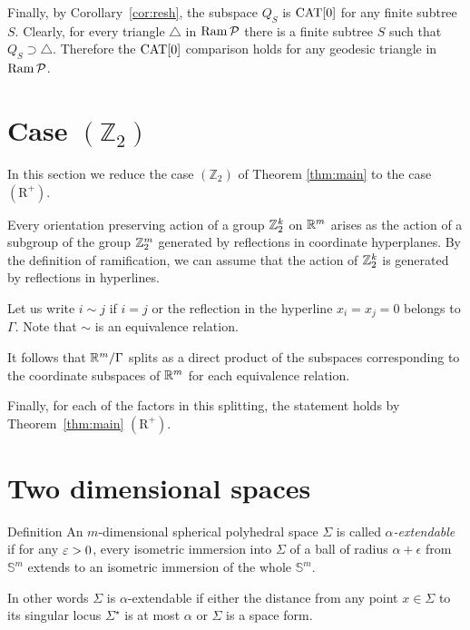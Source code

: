 \documentclass[oneside,a4paper]{article}
\def\Ram{\mathop{\rm Ram}\nolimits}
\def\SS{\mathbb{S}}
\begin{document}
Finally, by Corollary~\ref{cor:resh},
the subspace $Q_S$ is  $\mathrm{CAT}[0]$ for any finite subtree $S$.
Clearly, for every triangle $\triangle$ in $\Ram\mathcal{P}$
there is a finite subtree $S$ such that $Q_S\supset\triangle$.
Therefore the $\mathrm{CAT}[0]$ comparison holds for any geodesic triangle in $\Ram\mathcal{P}$.
\qeds

\section{Case $(\mathbb{Z}_2)$}

In this section we reduce the case $(\mathbb{Z}_2)$ of Theorem \ref{thm:main} to  the case $(\mathrm{R}^+)$.

Every orientation preserving action of a group $\mathbb{Z}_2^k$ on $\mathbb{R}^m$ arises as
the action of a subgroup of the group $\mathbb{Z}_2^m$ generated by reflections in coordinate  hyperplanes.
By the definition of ramification, 
we can assume that the action of $\mathbb{Z}_2^k$ 
is generated by reflections in hyperlines.

Let us write $i\sim j$ if $i=j$ or  the reflection in
the hyperline $x_i=x_j=0$ belongs to $\Gamma$.
Note that $\sim$ is an equivalence relation.

It follows that $\mathbb{R}^m/\Gamma$ splits as a direct product of the subspaces corresponding to the coordinate subspaces of $\mathbb{R}^m$ for each equivalence relation.

Finally, for each of the factors in this splitting,
the statement holds by Theorem~\ref{thm:main} $(\mathrm{R}^+)$.
\qeds















\section{Two dimensional spaces}\label{ramsphere}

\begin{thm}{Definition} An $m$-dimensional spherical polyhedral space  $\Sigma$ is called \emph{$\alpha$-extendable}
if for any $\varepsilon>0$,
every isometric immersion into $\Sigma$
of a ball of radius $\alpha+\epsilon$
from $\SS^m$ extends to an isometric immersion of the whole $\SS^m$.

In other words
$\Sigma$ is $\alpha$-extendable if
either
the distance from any point $x\in \Sigma$
to its singular locus $\Sigma^{{\star}}$ is at most $\alpha$
or $\Sigma$ is a space form.
\end{thm}
\end{document}

